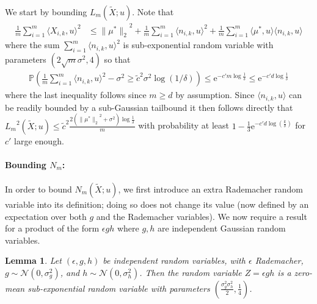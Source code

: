 \documentclass[twoside,11pt]{article}
\newtheorem{lems}{Lemma}
\newcommand{\Prob}{\ensuremath{{\mathbb{P}}}}
\newcommand{\NORMAL}{\ensuremath{\mathcal{N}}}
\def\E{ \mathrm{e} }							%
\newcommand{\norm}[1]{\ensuremath{\|#1\|_2}}
\newcommand{\paramobs}{\mu}
\newcommand{\trueparamobs}{\ensuremath{\paramobs^*}}
\newcommand{\kdim}{\ensuremath{k}}
\newcommand{\Xtil}{\ensuremath{\widetilde{X}}}
\newcommand{\lipproc}{\ensuremath{L_m}}
\newcommand{\processradN}{\ensuremath{N_m}}
\begin{document}
We start by bounding $\lipproc(\Xtil;u)$. Note that
\begin{align*}
\frac{1}{m}\sum_{i=1}^{m} \langle X_{i,k},u\rangle^2 &\leq
\norm{\trueparamobs}^2 + \frac{1}{m}\sum_{i=1}^m \langle
n_{i,k},u\rangle^2 + \frac{1}{m}\sum_{i=1}^m \langle \trueparamobs,
u\rangle \langle n_{i,k},u\rangle
\end{align*}
where the sum $\sum_{i=1}^m \langle n_{i,k}, u\rangle^2$ is
sub-exponential random variable with parameters $(2\sqrt{m} \sigma^2,
4)$ so that
\begin{align*}
\Prob(\frac{1}{m}\sum_{i=1}^m \langle n_{i,k},u\rangle^2 - \sigma^2
\geq \tilde{c}^2 \sigma^2 \log (1/\delta)) \leq \E^{-c' m \log
  \frac{1}{\delta}} \leq \E^{-c' d \log \frac{1}{\delta}}
\end{align*}
where the last inequality follows since $m \geq d$ by assumption.
Since $\langle n_{i,k},u \rangle$ can be readily bounded by a
sub-Gaussian tailbound it then follows directly that
$\lipproc^2(\Xtil;u) \leq \tilde{c}^2 \frac{2 (\norm{\trueparamobs}^2
  + \sigma^2) \log \frac{1}{\delta}}{m}$ with probability at least $1
- \frac{1}{3}\E^{-c' d \log (\frac{\kdim}{\delta})}$ for $c'$ large
enough.
%

\paragraph{Bounding $\processradN$:}

In order to bound $\processradN(\Xtil;u)$, we first introduce an extra
Rademacher random variable into its definition; doing so does not
change its value (now defined by an expectation over both $g$ and the
Rademacher variables). We now require a result for a product of the
form $\epsilon g h$ where $g,h$ are independent Gaussian random
variables.
\begin{lems}
\label{LemProductGauss}
Let $(\epsilon, g, h)$ be independent random variables, with
$\epsilon$ Rademacher, \mbox{ $g \sim \NORMAL(0, \sigma_g^2)$,} and
\mbox{$h \sim \NORMAL(0, \sigma_h^2)$.}  Then the random variable $Z =
\epsilon g h$ is a zero-mean sub-exponential random variable with
parameters $(\frac{\sigma_g^2\sigma_h^2}{2}, \frac{1}{4})$.
\end{lems}
\end{document}

